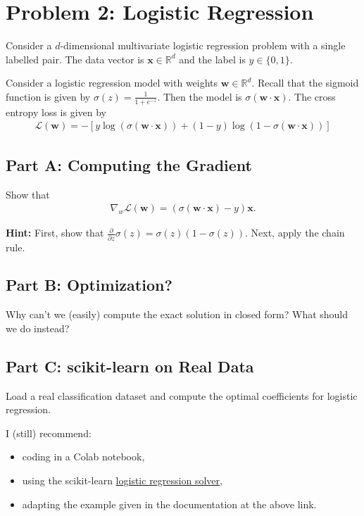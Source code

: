 \documentclass{article}
\begin{document}
%

\newpage
\section*{Problem 2: Logistic Regression}

Consider a $d$-dimensional multivariate logistic regression problem with a single labelled pair.
The data vector is $\mathbf{x} \in \mathbb{R}^d$ and the label is $y \in \{0,1\}$.

Consider a logistic regression model with weights $\mathbf{w} \in \mathbb{R}^d$.
Recall that the sigmoid function is given by $\sigma(z) = \frac1{1+e^{-z}}.$
Then the model is $\sigma(\mathbf{w} \cdot \mathbf{x})$.
The cross entropy loss is given by
\begin{align}
    \mathcal{L}(\mathbf{w})
    = -  \left[y \log(\sigma(\mathbf{w} \cdot \mathbf{x})) + 
    (1-y) \log(1-\sigma(\mathbf{w} \cdot \mathbf{x}))\right]
\end{align}

\subsection*{Part A: Computing the Gradient}

Show that 
\begin{align}
    \nabla_w\mathcal{L}(\mathbf{w}) = (\sigma(\mathbf{w} \cdot \mathbf{x})-y)\mathbf{x}.
\end{align}

\textbf{Hint:} First, show that $\frac{\partial}{\partial z} \sigma(z) = \sigma(z) (1- \sigma(z))$. Next, apply the chain rule.

\subsection*{Part B: Optimization?}

Why can't we (easily) compute the exact solution in closed form?
What should we do instead?

\subsection*{Part C: scikit-learn on Real Data}

Load a real classification dataset and compute the optimal coefficients for logistic regression.

I (still) recommend:
\begin{itemize}
    \item coding in a Colab notebook,
    \item using the scikit-learn \href{https://scikit-learn.org/stable/modules/generated/sklearn.linear_model.LogisticRegression.html}{logistic regression solver},
    \item adapting the example given in the documentation at the above link.
\end{itemize}
\end{document}
